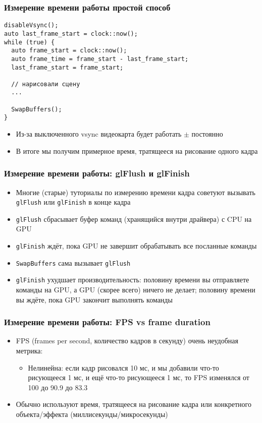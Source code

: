 \documentclass{beamer}
\begin{document}
\begin{frame}[fragile]
\frametitle{Измерение времени работы \textendash{} простой способ}
\begin{verbatim}
disableVsync();
auto last_frame_start = clock::now();
while (true) {
  auto frame_start = clock::now();
  auto frame_time = frame_start - last_frame_start;
  last_frame_start = frame_start;

  // нарисовали сцену
  ...

  SwapBuffers();
}
\end{verbatim}
\pause
\begin{itemize}
\item Из-за выключенного vsync видеокарта будет работать \begin{math}\pm\end{math} постоянно
\pause
\item В итоге мы получим примерное время, тратящееся на рисование одного кадра
\end{itemize}
\end{frame}

\begin{frame}[fragile]
\frametitle{Измерение времени работы: glFlush и glFinish}
\begin{itemize}
\item Многие (старые) туториалы по измерению времени кадра советуют вызывать \verb|glFlush| или \verb|glFinish| в конце кадра
\pause
\item \verb|glFlush| сбрасывает буфер команд (хранящийся внутри драйвера) с CPU на GPU
\pause
\item \verb|glFinish| ждёт, пока GPU не завершит обрабатывать все посланные команды
\pause
\item \verb|SwapBuffers| сама вызывает \verb|glFlush|
\pause
\item \verb|glFinish| ухудшает производительность: половину времени вы отправляете команды на GPU, а GPU (скорее всего) ничего не делает; половину времени вы ждёте, пока GPU закончит выполнять команды
\end{itemize}
\end{frame}

\begin{frame}[fragile]
\frametitle{Измерение времени работы: FPS vs frame duration}
\begin{itemize}
\item FPS (frames per second, количество кадров в секунду) \textendash{} очень неудобная метрика:
\pause
\begin{itemize}
\item Нелинейна: если кадр рисовался 10 мс, и мы добавили что-то рисующееся 1 мс, и ещё что-то рисующееся 1 мс, то FPS изменялся от 100 до 90.9 до 83.3
\end{itemize}
\pause
\item Обычно используют время, тратящееся на рисование кадра или конкретного объекта/эффекта (миллисекунды/микросекунды)
\end{itemize}
\end{frame}
\end{document}
